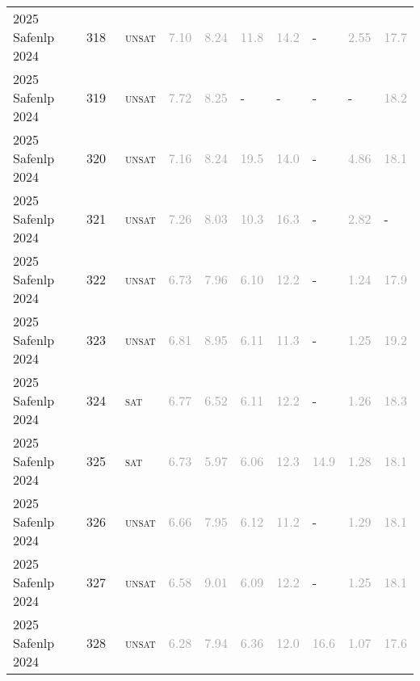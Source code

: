 \begin{center}
{\begin{longtable}{@{}llllllllll@{}}
2025 Safenlp 2024 & 318 & ~\textsc{unsat} & \textcolor{darkgray}{7.10} & \textcolor{darkgray}{8.24} & \textcolor{darkgray}{11.8} & \textcolor{darkgray}{14.2} & - & \textcolor{darkgray}{2.55} & \textcolor{darkgray}{17.7} \\
2025 Safenlp 2024 & 319 & ~\textsc{unsat} & \textcolor{darkgray}{7.72} & \textcolor{darkgray}{8.25} & - & - & - & - & \textcolor{darkgray}{18.2} \\
2025 Safenlp 2024 & 320 & ~\textsc{unsat} & \textcolor{darkgray}{7.16} & \textcolor{darkgray}{8.24} & \textcolor{darkgray}{19.5} & \textcolor{darkgray}{14.0} & - & \textcolor{darkgray}{4.86} & \textcolor{darkgray}{18.1} \\
2025 Safenlp 2024 & 321 & ~\textsc{unsat} & \textcolor{darkgray}{7.26} & \textcolor{darkgray}{8.03} & \textcolor{darkgray}{10.3} & \textcolor{darkgray}{16.3} & - & \textcolor{darkgray}{2.82} & - \\
2025 Safenlp 2024 & 322 & ~\textsc{unsat} & \textcolor{darkgray}{6.73} & \textcolor{darkgray}{7.96} & \textcolor{darkgray}{6.10} & \textcolor{darkgray}{12.2} & - & \textcolor{darkgray}{1.24} & \textcolor{darkgray}{17.9} \\
2025 Safenlp 2024 & 323 & ~\textsc{unsat} & \textcolor{darkgray}{6.81} & \textcolor{darkgray}{8.95} & \textcolor{darkgray}{6.11} & \textcolor{darkgray}{11.3} & - & \textcolor{darkgray}{1.25} & \textcolor{darkgray}{19.2} \\
2025 Safenlp 2024 & 324 & ~\textsc{sat} & \textcolor{darkgray}{6.77} & \textcolor{darkgray}{6.52} & \textcolor{darkgray}{6.11} & \textcolor{darkgray}{12.2} & - & \textcolor{darkgray}{1.26} & \textcolor{darkgray}{18.3} \\
2025 Safenlp 2024 & 325 & ~\textsc{sat} & \textcolor{darkgray}{6.73} & \textcolor{darkgray}{5.97} & \textcolor{darkgray}{6.06} & \textcolor{darkgray}{12.3} & \textcolor{darkgray}{14.9} & \textcolor{darkgray}{1.28} & \textcolor{darkgray}{18.1} \\
2025 Safenlp 2024 & 326 & ~\textsc{unsat} & \textcolor{darkgray}{6.66} & \textcolor{darkgray}{7.95} & \textcolor{darkgray}{6.12} & \textcolor{darkgray}{11.2} & - & \textcolor{darkgray}{1.29} & \textcolor{darkgray}{18.1} \\
2025 Safenlp 2024 & 327 & ~\textsc{unsat} & \textcolor{darkgray}{6.58} & \textcolor{darkgray}{9.01} & \textcolor{darkgray}{6.09} & \textcolor{darkgray}{12.2} & - & \textcolor{darkgray}{1.25} & \textcolor{darkgray}{18.1} \\
2025 Safenlp 2024 & 328 & ~\textsc{unsat} & \textcolor{darkgray}{6.28} & \textcolor{darkgray}{7.94} & \textcolor{darkgray}{6.36} & \textcolor{darkgray}{12.0} & \textcolor{darkgray}{16.6} & \textcolor{darkgray}{1.07} & \textcolor{darkgray}{17.6} \\

\end{longtable}}
\end{center}
